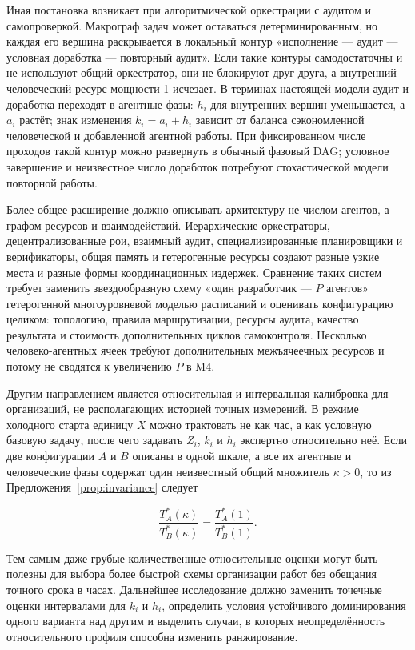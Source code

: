 Иная постановка возникает при алгоритмической оркестрации с аудитом и самопроверкой.
Макрограф задач может оставаться детерминированным, но каждая его вершина раскрывается
в локальный контур «исполнение --- аудит --- условная доработка --- повторный аудит». Если
такие контуры самодостаточны и не используют общий оркестратор, они не блокируют друг
друга, а внутренний человеческий ресурс мощности 1 исчезает. В терминах настоящей
модели аудит и доработка переходят в агентные фазы: $h_i$ для внутренних вершин
уменьшается, а $a_i$ растёт; знак изменения $k_i=a_i+h_i$ зависит от баланса
сэкономленной человеческой и добавленной агентной работы. При фиксированном числе проходов такой
контур можно развернуть в обычный фазовый DAG; условное завершение и неизвестное число
доработок потребуют стохастической модели повторной работы.

Более общее расширение должно описывать архитектуру не числом агентов, а графом
ресурсов и взаимодействий. Иерархические оркестраторы, децентрализованные рои,
взаимный аудит, специализированные планировщики и верификаторы, общая память и
гетерогенные ресурсы создают разные узкие места и разные формы координационных издержек.
Сравнение таких систем требует заменить звездообразную схему «один разработчик --- $P$
агентов» гетерогенной многоуровневой моделью расписаний и оценивать конфигурацию
целиком: топологию, правила маршрутизации, ресурсы аудита, качество результата и стоимость
дополнительных циклов самоконтроля. Несколько человеко-агентных ячеек требуют
дополнительных межъячеечных ресурсов и потому не сводятся к увеличению $P$ в M4.

Другим направлением является относительная и интервальная калибровка для организаций, не
располагающих историей точных измерений. В режиме холодного старта единицу $X$ можно трактовать
не как час, а как условную базовую задачу, после чего задавать $Z_i$, $k_i$ и $h_i$ экспертно
относительно неё. Если две конфигурации $A$ и $B$ описаны в одной шкале, а все их агентные и
человеческие фазы содержат один неизвестный общий множитель $\kappa>0$, то из
Предложения~\ref{prop:invariance} следует

\[
\frac{T_A^*(\kappa)}{T_B^*(\kappa)}=
\frac{T_A^*(1)}{T_B^*(1)}.
\]

Тем самым даже грубые количественные относительные оценки могут быть полезны
для выбора более быстрой схемы организации работ без обещания точного срока в часах.
Дальнейшее исследование должно заменить точечные оценки интервалами для $k_i$ и $h_i$,
определить условия устойчивого доминирования одного варианта над другим и выделить
случаи, в которых неопределённость относительного профиля способна изменить ранжирование.

